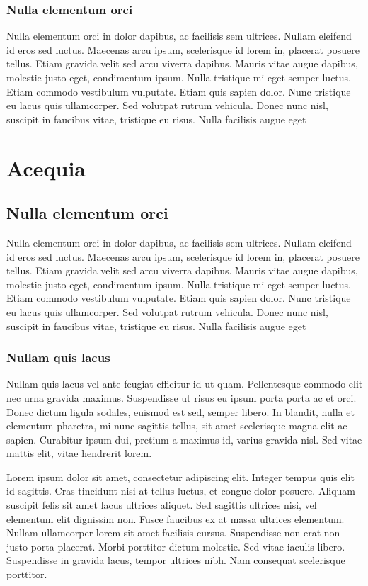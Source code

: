\subsubsection{Nulla elementum orci}

Nulla elementum orci in dolor dapibus, ac facilisis sem ultrices. Nullam eleifend id eros sed luctus. Maecenas arcu ipsum, scelerisque id lorem in, placerat posuere tellus. Etiam gravida velit sed arcu viverra dapibus. Mauris vitae augue dapibus, molestie justo eget, condimentum ipsum. Nulla tristique mi eget semper luctus. Etiam commodo vestibulum vulputate. Etiam quis sapien dolor. Nunc tristique eu lacus quis ullamcorper. Sed volutpat rutrum vehicula. Donec nunc nisl, suscipit in faucibus vitae, tristique eu risus. Nulla facilisis augue eget


\section{Acequia}

\subsection{Nulla elementum orci}

Nulla elementum orci in dolor dapibus, ac facilisis sem ultrices. Nullam eleifend id eros sed luctus. Maecenas arcu ipsum, scelerisque id lorem in, placerat posuere tellus. Etiam gravida velit sed arcu viverra dapibus. Mauris vitae augue dapibus, molestie justo eget, condimentum ipsum. Nulla tristique mi eget semper luctus. Etiam commodo vestibulum vulputate. Etiam quis sapien dolor. Nunc tristique eu lacus quis ullamcorper. Sed volutpat rutrum vehicula. Donec nunc nisl, suscipit in faucibus vitae, tristique eu risus. Nulla facilisis augue eget


\subsubsection{Nullam quis lacus}

Nullam quis lacus vel ante feugiat efficitur id ut quam. Pellentesque commodo elit nec urna gravida maximus. Suspendisse ut risus eu ipsum porta porta ac et orci. Donec dictum ligula sodales, euismod est sed, semper libero. In blandit, nulla et elementum pharetra, mi nunc sagittis tellus, sit amet scelerisque magna elit ac sapien. Curabitur ipsum dui, pretium a maximus id, varius gravida nisl. Sed vitae mattis elit, vitae hendrerit lorem.

Lorem ipsum dolor sit amet, consectetur adipiscing elit. Integer tempus quis elit id sagittis. Cras tincidunt nisi at tellus luctus, et congue dolor posuere. Aliquam suscipit felis sit amet lacus ultrices aliquet. Sed sagittis ultrices nisi, vel elementum elit dignissim non. Fusce faucibus ex at massa ultrices elementum. Nullam ullamcorper lorem sit amet facilisis cursus. Suspendisse non erat non justo porta placerat. Morbi porttitor dictum molestie. Sed vitae iaculis libero. Suspendisse in gravida lacus, tempor ultrices nibh. Nam consequat scelerisque porttitor.

